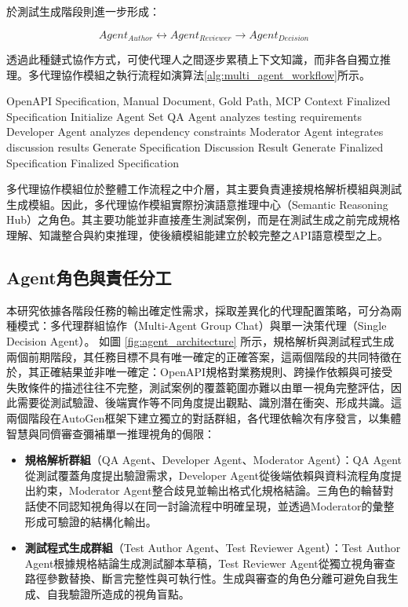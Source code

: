 \begin{ZhChapter}
\text 於測試生成階段則進一步形成：

\begin{equation}
Agent_{Author}
\leftrightarrow
Agent_{Reviewer}
\rightarrow
Agent_{Decision}
\end{equation}

\text 透過此種鏈式協作方式，可使代理人之間逐步累積上下文知識，而非各自獨立推理。多代理協作模組之執行流程如演算法\ref{alg:multi_agent_workflow}所示。

\begin{algorithm}[htbp]
\caption{多代理協作流程}
\label{alg:multi_agent_workflow}
\begin{algorithmic}[1]
\REQUIRE OpenAPI Specification, Manual Document, Gold Path, MCP Context
\ENSURE Finalized Specification
\STATE Initialize Agent Set
\STATE QA Agent analyzes testing requirements
\STATE Developer Agent analyzes dependency constraints
\STATE Moderator Agent integrates discussion results
\STATE Generate Specification Discussion Result
\STATE Generate Finalized Specification
\RETURN Finalized Specification
\end{algorithmic}
\end{algorithm}

\text 多代理協作模組位於整體工作流程之中介層，其主要負責連接規格解析模組與測試生成模組。因此，多代理協作模組實際扮演語意推理中心（Semantic Reasoning Hub）之角色。其主要功能並非直接產生測試案例，而是在測試生成之前完成規格理解、知識整合與約束推理，使後續模組能建立於較完整之API語意模型之上。

\subsection{Agent角色與責任分工}

\text 本研究依據各階段任務的輸出確定性需求，採取差異化的代理配置策略，可分為兩種模式：多代理群組協作（Multi-Agent Group Chat）與單一決策代理（Single Decision Agent）。
\text 如圖 \ref{fig:agent_architecture} 所示，規格解析與測試程式生成兩個前期階段，其任務目標不具有唯一確定的正確答案，這兩個階段的共同特徵在於，其正確結果並非唯一確定：OpenAPI規格對業務規則、跨操作依賴與可接受失敗條件的描述往往不完整，測試案例的覆蓋範圍亦難以由單一視角完整評估，因此需要從測試驗證、後端實作等不同角度提出觀點、識別潛在衝突、形成共識。這兩個階段在AutoGen框架下建立獨立的對話群組，各代理依輪次有序發言，以集體智慧與同儕審查彌補單一推理視角的侷限：
\begin{itemize}
  \item \textbf{規格解析群組}（QA Agent、Developer Agent、Moderator Agent）：QA Agent從測試覆蓋角度提出驗證需求，Developer Agent從後端依賴與資料流程角度提出約束，Moderator Agent整合歧見並輸出格式化規格結論。三角色的輪替對話使不同認知視角得以在同一討論流程中明確呈現，並透過Moderator的彙整形成可驗證的結構化輸出。
  \item \textbf{測試程式生成群組}（Test Author Agent、Test Reviewer Agent）：Test Author Agent根據規格結論生成測試腳本草稿，Test Reviewer Agent從獨立視角審查路徑參數替換、斷言完整性與可執行性。生成與審查的角色分離可避免自我生成、自我驗證所造成的視角盲點。
\end{itemize}


\end{ZhChapter}
